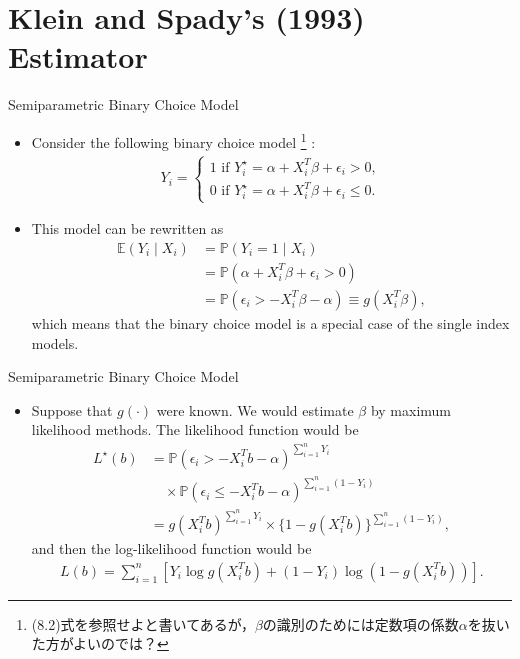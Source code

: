 \documentclass[xcolor=svgnames,dvipdfmx,cjk]{beamer}
\theoremstyle{example}
\def\E{\mathbb{E}}
\def\P{\mathbb{P}}
\begin{document}
\section{Klein and Spady's (1993) Estimator}
  
\begin{frame}{Semiparametric Binary Choice Model}
 \begin{itemize}
  \item Consider the following binary choice model
        \footnote{(8.2)式を参照せよと書いてあるが，$\beta$の識別のためには定数項の係数$\alpha$を抜いた方がよいのでは？}
        :
        \begin{align*}
          Y_i = \left\{
            \begin{array}{l}
              1 \text{ if } Y_i^{\star} = \alpha + X_i^T \beta + \epsilon_i > 0, 
              \\ 
              0 \text{ if } Y_i^{\star} = \alpha + X_i^T \beta + \epsilon_i \leq 0.
            \end{array}
            \right.
        \end{align*}
  \item This model can be rewritten as
        \begin{align*}
          \E(Y_i \mid X_i) 
          &= \P(Y_i = 1 \mid X_i)\\
          &= \P( \alpha + X_i^T \beta + \epsilon_i > 0)\\
          &= \P(\epsilon_i > -X_i^T \beta - \alpha)
          \equiv g(X_i^T\beta),
        \end{align*}
        which means that the binary choice model is a special case of the single index models.
 \end{itemize} 
\end{frame} 
  
  
\begin{frame}{Semiparametric Binary Choice Model}
\begin{itemize}
  \item Suppose that $g(\cdot)$ were known. 
        We would estimate $\beta$ by maximum likelihood methods.
        The likelihood function would be 
        \begin{align*}
          L^{\star}(b) &= \P(\epsilon_i > -X_i^Tb - \alpha)^{\sum_{i=1}^n Y_i}\\
                       &\quad \times 
                        \P(\epsilon_i \leq -X_i^Tb  -\alpha)^{\sum_{i=1}^n (1-Y_i)} \\
                       &= g(X_i^Tb)^{\sum_{i=1}^n Y_i} \times \{1-g(X_i^Tb)\}^{\sum_{i=1}^n (1-Y_i)},
        \end{align*}
        and then the log-likelihood function would be
        \begin{align*}
          L(b) = \sum_{i=1}^{n}[Y_i \log g(X_i^Tb) + (1 - Y_i) \log (1 - g(X_i^Tb))].
        \end{align*}
\end{itemize}
\end{frame}  
 
\end{document}
